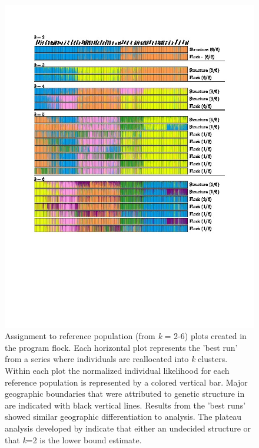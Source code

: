 \begin{figure}
\begin{center}
    \includegraphics[width=\textwidth]{images/Figures-Pat/Flock-Fig1.jpg}  
    \caption{Assignment to reference population (from \textit{k} = 2-6) plots created 
in the program {\sc flock}. Each horizontal plot represents the 'best run' from a 
series where individuals are reallocated into \textit{k} clusters. Within each plot 
the normalized individual likelihood for each reference population is represented by a 
colored vertical bar. Major geographic boundaries that were attributed to genetic 
structure in \citet{Garzaetal_norcal} are indicated with black vertical lines. Results 
from the 'best runs' showed similar geographic differentiation to 
\citet{Garzaetal_norcal} analysis. The plateau analysis developed by 
\citet{Duc&Tur2012} indicate that either an undecided structure or that \textit{k}=2 
is the lower bound estimate.}
    \label{Fig.1}
\end{center}
\end{figure}

